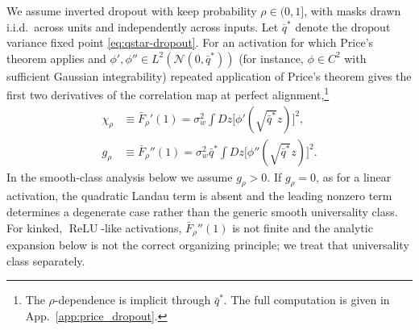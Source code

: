 \documentclass{article}
\DeclareMathOperator{\ReLU}{ReLU}
\newcommand{\relu}{\ensuremath{\ReLU}}
\theoremstyle{plain}
\theoremstyle{definition}
\theoremstyle{remark}
\begin{document}
We assume inverted dropout with keep probability \(\rho\in(0,1]\), with masks drawn i.i.d.\ across units and
independently across inputs. Let \(\bar q^*\) denote the dropout variance fixed point \eqref{eq:qstar-dropout}.
For an activation for which Price's theorem applies and \(\phi',\phi''\in L^2(\mathcal N(0,\bar q^\ast))\) (for instance, \(\phi\in C^2\) with sufficient Gaussian integrability) repeated application of Price's theorem gives the first two
derivatives of the correlation map at perfect alignment,\footnote{The \(\rho\)-dependence is implicit
through \(\bar q^*\). The full computation is given in App.~\ref{app:price_dropout}.}
\relax
\begin{align}
\chi_\rho &\equiv \bar F_\rho'(1) = \sigma_w^2\int Dz \big[\phi'(\sqrt{\bar q^{*}} z)\big]^2,
\label{eq:chi_dropout}\\
g_\rho &\equiv \bar F_\rho''(1) = \sigma_w^2 \bar q^{*}\int Dz \big[\phi''(\sqrt{\bar q^{*}} z)\big]^2.
\label{eq:g_dropout}
\end{align}
\relax
In the smooth-class analysis below we assume \(g_\rho>0\). If \(g_\rho=0\), as for a linear activation, the quadratic Landau term is absent and the leading nonzero term determines a degenerate case rather than the generic smooth universality class.
For kinked, \relu{}-like activations, \(\bar F_\rho''(1)\) is not finite and the analytic expansion below is not the
correct organizing principle; we treat that universality class separately.
\end{document}
